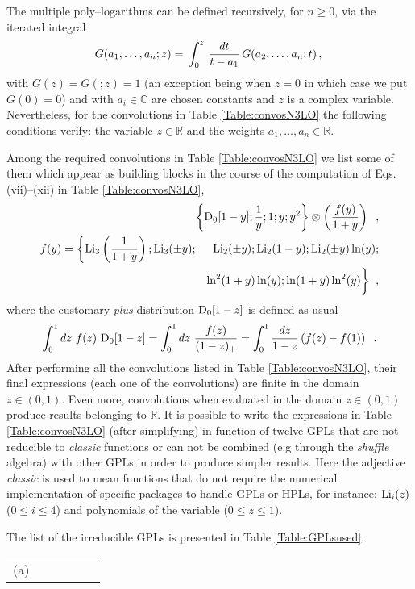 \documentclass[12pt]{article}
\def\beq{\begin{equation}}
\def\eeq{\end{equation}}
\def\beeq{\begin{eqnarray}}
\def\eeeq{\end{eqnarray}}
\def\nn{\nonumber}
\newcommand\f[2]{\frac{#1}{#2}}
\newcommand{\rd}{d}
\begin{document}
\begin{appendix}
The multiple poly--logarithms can be defined recursively, for $n\geq 0$, via the iterated integral~\cite{Goncharov:1998kja,Goncharov:2001iea}
 \beq\label{MultPolyLogdef}
 G(a_1,\ldots,a_n;z)=\,\int_0^z\,\frac{\rd t}{t-a_1}\,G(a_2,\ldots,a_n;t)\,,\\
\eeq
with $G(z) = G(;z)=1$ (an exception being when $z=0$ in which case we put $G(0)=0$) and with $a_i\in \mathbb{C}$ are chosen constants and $z$ is a complex variable. Nevertheless, for the convolutions in Table \ref{Table:convosN3LO} the following conditions verify: the variable $z\in \mathbb{R}$ and the weights $a_1,\ldots,a_n \in \mathbb{R}$.

Among the required convolutions in Table \ref{Table:convosN3LO} we list some of them which appear as building blocks in the course of the computation of Eqs.  (vii)--(xii) in Table \ref{Table:convosN3LO},
\beeq
\!\!\!\!\!\!\!\!\!\!\!\!&&\!\!\!\!\!\!\!\!\!\!\!\!\!\!\!\!\!\!\!\!\!\!\!\!\!\!\!\!\!\!\!\!\!\!\!\!\!\!\!\!\!\!\!\!\!\!\!\!\bigg\{{\rm D}_{0}[1-y];\f{1}{y};1;y;y^{2}\bigg\} \otimes \left( \f{f(y)}{1+y} \right)\;\;,\\
f(y)=\bigg\{{\rm Li}_{3}\left(\f{1}{1+y}\right); {\rm Li}_{3}(\pm y);&&\!\!\!\!\!\!\!\!\!{\rm Li}_{2}(\pm y); {\rm Li}_{2}(1- y); {\rm Li}_{2}(\pm y) \ln(y);\nn\\
&&\ln^{2}(1+y)\ln(y);\ln(1+y)\ln^{2}(y)\bigg\}\;\;,
\eeeq
where the customary \textit{plus} distribution ${\rm D}_{0}[1-z]$ is defined as usual 
\beeq
\int^{1}_{0}dz~f(z)~{\rm D}_{0}[1-z] =\int^{1}_{0}dz~\f{f(z)}{(1-z)_{+}} = \int^{1}_{0}\f{dz}{1-z}\left( f(z)-f(1)\right)\;\;.
\eeeq
After performing all the convolutions listed in Table \ref{Table:convosN3LO}, their final expressions (each one of the convolutions) are finite in the domain $z\in (0,1)$. Even more, convolutions when evaluated in the domain $z\in (0,1)$ produce results belonging to $\mathbb{R}$. It is possible to write the expressions in Table \ref{Table:convosN3LO} (after simplifying) in function of twelve GPLs that are not reducible to \textit{classic} functions or can not be combined (e.g through the \textit{shuffle} algebra) with other GPLs in order to produce simpler results. Here the adjective  \textit{classic} is used to mean functions that do not require the numerical implementation of specific packages to handle GPLs or HPLs, for instance: ${\rm Li}_{i}(z)$ ($ 0 \leq i \leq 4$) and polynomials of the variable ($ 0 \leq z \leq 1$).

The list of the irreducible GPLs is presented in Table \ref{Table:GPLsused}.
\begin{table}
\begin{center}
\renewcommand{\arraystretch}{1.5}
\begin{tabular}{ |c|c||c|c||c|c| }
\hline
\multirow{1}{*}{(a)} 


\end{tabular}
\end{center}
\end{table}
\end{appendix}
\end{document}
